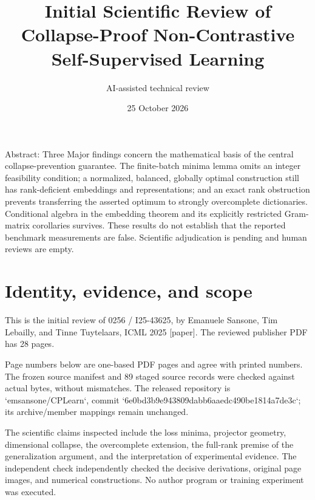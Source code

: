 \documentclass[10pt]{article}
\title{Initial Scientific Review of
Collapse-Proof Non-Contrastive Self-Supervised Learning}
\author{AI-assisted technical review}
\date{25 October 2026}
\begin{document}
\maketitle
Abstract: Three Major findings concern the mathematical basis of the central collapse-prevention guarantee. The finite-batch minima lemma omits an integer feasibility condition; a normalized, balanced, globally optimal construction still has rank-deficient embeddings and representations; and an exact rank obstruction prevents transferring the asserted optimum to strongly overcomplete dictionaries. Conditional algebra in the embedding theorem and its explicitly restricted Gram-matrix corollaries survives. These results do not establish that the reported benchmark measurements are false. Scientific adjudication is pending and human reviews are empty.\par
\section*{Identity, evidence, and scope}
This is the initial review of 0256 / I25-43625, by Emanuele Sansone, Tim Lebailly, and Tinne Tuytelaars, ICML 2025 [paper]. The reviewed publisher PDF has 28 pages.\par
Page numbers below are one-based PDF pages and agree with printed numbers. The frozen source manifest and 89 staged source records were checked against actual bytes, without mismatches. The released repository is `emsansone/CPLearn`, commit `6e0bd3b9e943809dabb6aaedc490be1814a7de3c`; its archive/member mappings remain unchanged.\par
The scientific claims inspected include the loss minima, projector geometry, dimensional collapse, the overcomplete extension, the full-rank premise of the generalization argument, and the interpretation of experimental evidence. The independent check independently checked the decisive derivations, original page images, and numerical constructions. No author program or training experiment was executed.\par
\end{document}
